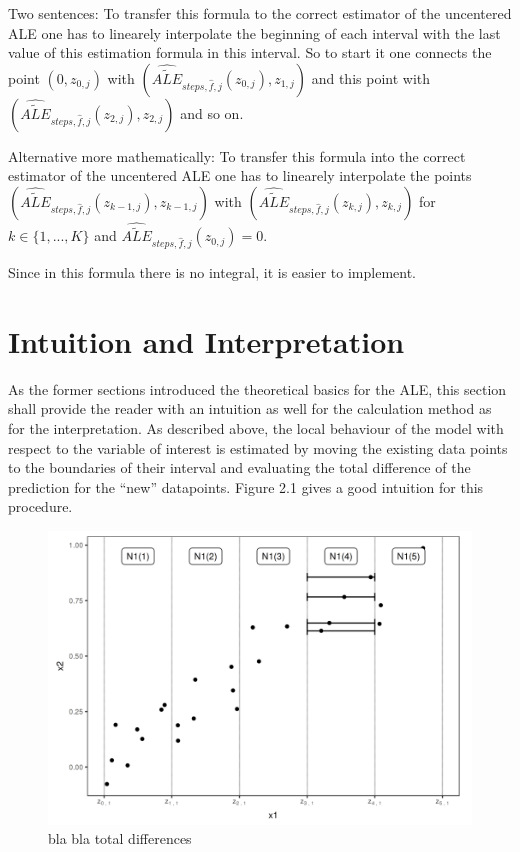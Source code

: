 \documentclass[]{krantz}
\begin{document}
Two sentences: To transfer this formula to the correct estimator of the
uncentered ALE one has to linearely interpolate the beginning of each
interval with the last value of this estimation formula in this
interval. So to start it one connects the point \((0,z_{0, j})\) with
\((\widehat{\widetilde{ALE}}_{steps, \hat{f},j}(z_{0, j}), z_{1, j})\)
and this point with
\((\widehat{\widetilde{ALE}}_{steps, \hat{f},j}(z_{2, j}), z_{2, j})\)
and so on.

Alternative more mathematically: To transfer this formula into the
correct estimator of the uncentered ALE one has to linearely interpolate
the points
\((\widehat{\widetilde{ALE}}_{steps, \hat{f},j}(z_{k-1, j}), z_{k-1, j})\)
with
\((\widehat{\widetilde{ALE}}_{steps, \hat{f},j}(z_{k, j}), z_{k, j})\)
for \(k \in \{1, ..., K \}\) and
\(\widehat{\widetilde{ALE}}_{steps, \hat{f},j}(z_{0, j}) = 0\).

Since in this formula there is no integral, it is easier to implement.

\section{Intuition and
Interpretation}\label{intuition-and-interpretation}

As the former sections introduced the theoretical basics for the ALE,
this section shall provide the reader with an intuition as well for the
calculation method as for the interpretation. As described above, the
local behaviour of the model with respect to the variable of interest is
estimated by moving the existing data points to the boundaries of their
interval and evaluating the total difference of the prediction for the
``new'' datapoints. Figure 2.1 gives a good intuition for this
procedure.

\begin{figure}
\includegraphics[width=13.75in]{images/ale_estimation_intuition} \caption{bla bla total differences}\label{fig:unnamed-chunk-1}
\end{figure}
\end{document}
